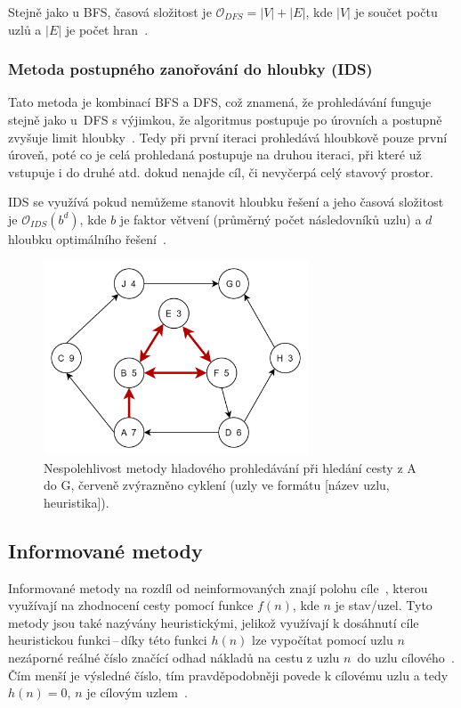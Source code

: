 Stejně jako u BFS, časová složitost je \(\mathcal{O}_{DFS} = |V| + |E|\), kde \(|V|\) je součet počtu uzlů a \(|E|\) je počet hran~\cite{CS225BFSDFS}.

\subsubsection*{\textbullet Metoda postupného zanořování do hloubky (IDS)}
Tato metoda je kombinací BFS a DFS, což znamená, že prohledávání funguje stejně jako u~DFS s výjimkou, že algoritmus postupuje po úrovních a postupně zvyšuje limit hloubky~\cite{poole2023artificial}. Tedy při první iteraci prohledává hloubkově pouze první úroveň, poté co je celá prohledaná postupuje na druhou iteraci, při které už vstupuje i do druhé atd. dokud nenajde cíl, či nevyčerpá celý stavový prostor. 

IDS se využívá pokud nemůžeme stanovit hloubku řešení a jeho časová složitost je \(\mathcal{O}_{IDS}(b^{d})\), kde \(b\) je faktor větvení (průměrný počet následovníků uzlu) a \(d\) hloubku optimálního řešení~\cite{izu}.

\begin{figure}[H]
    \centering
    \includegraphics[width=0.7\textwidth]{obrazky-figures/ch2/GreedySearch.png}
    \caption{Nespolehlivost metody hladového prohledávání při hledání cesty z A do G, červeně zvýrazněno cyklení (uzly ve formátu [název uzlu, heuristika]).~\cite{poole2023artificial}}
    \label{fig:GreedySearch}
\end{figure}

\subsection*{Informované metody}
Informované metody na rozdíl od neinformovaných znají polohu cíle~\cite{izu}, kterou využívají na zhodnocení cesty pomocí funkce  ${f(n)}$, kde ${n}$ je stav/uzel. Tyto metody jsou také nazývány heuristickými, jelikož využívají k dosáhnutí cíle heuristickou funkci\,--\,díky této funkci ${h(n)}$ lze vypočítat pomocí uzlu ${n}$ nezáporné reálné číslo značící odhad nákladů na cestu z uzlu ${n}$~do uzlu cílového~\cite{poole2023artificial}. Čím menší je výsledné číslo, tím pravděpodobněji povede k cílovému uzlu a tedy ${h(n) = 0}$, ${n}$ je cílovým uzlem~\cite{AI-Modern_approach}.


